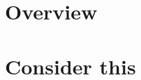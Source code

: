 \documentclass[main.tex]{subfiles}
\begin{document}
\section{Overview}\label{intro:over}
  
\section{Consider this}\label{intro:consider}
  
\end{document}
